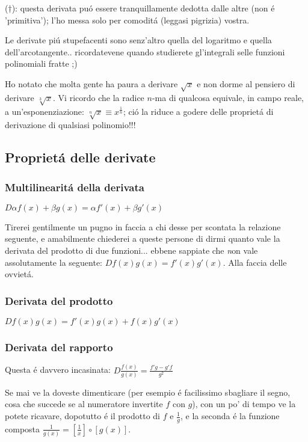 {\small ($\dagger$): questa derivata pu\'o essere tranquillamente dedotta dalle altre (non \'e 'primitiva'); l'ho messa solo per comodit\'a (leggasi pigrizia) vostra.}

Le derivate pi\'u stupefacenti sono senz'altro quella del logaritmo e quella dell'arcotangente..
ricordatevene quando studierete gl'integrali selle funzioni polinomiali fratte ;)

Ho notato che molta gente ha paura a derivare $\sqrt{x}$ e non dorme al pensiero di derivare $\sqrt[3]{x}$.
Vi ricordo che la radice $n$-ma di qualcosa equivale, in campo reale, a un'esponenziazione: $\sqrt[n]{x} \equiv x^{\frac{1}{n}}$;
ci\'o la riduce a godere delle propriet\'a di derivazione di qualsiasi polinomio!!!


\subsection{Propriet\'a delle derivate}

\subsubsection{Multilinearit\'a della derivata}

$D \alpha f(x)+\beta g(x) = \alpha f'(x) + \beta g'(x)$

Tirerei gentilmente un pugno in faccia a chi desse per scontata la relazione seguente, e amabilmente chiederei
a queste persone di dirmi quanto vale la derivata del prodotto di due funzioni... ebbene sappiate che
{\emph non vale assolutamente} la seguente: $D f(x)g(x) = f'(x)g'(x)$. Alla faccia delle ovviet\'a.
\subsubsection{Derivata del prodotto}

$D  f(x)g(x) = f'(x)g(x) + f(x) g'(x)$

\subsubsection{Derivata del rapporto}

Questa \'e davvero incasinata:
$D  \frac{f(x)}{g(x)} = \frac{f'g-g'f}{g^2}$

Se mai ve la doveste dimenticare (per esempio \'e facilissimo sbagliare il segno, cosa che succede se al numeratore invertite $f$ con $g$), con un po' di tempo ve la potete ricavare, dopotutto \'e il prodotto di $f$ e $\frac{1}{g}$, e la seconda \'e la funzione composta $\frac{1}{g(x)}=[\frac{1}{x}]\circ[g(x)]$. 

